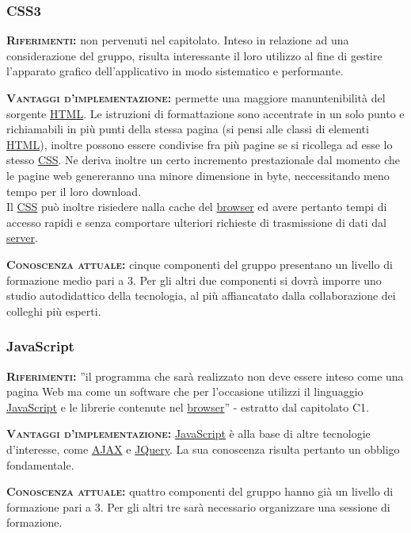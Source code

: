 \subsubsection{CSS3}
\begin{description}
	\item{\scshape\bfseries Riferimenti:} non pervenuti nel capitolato. Inteso in relazione ad una considerazione del gruppo, risulta interessante il loro utilizzo al fine di gestire l'apparato grafico dell'applicativo in modo sistematico e performante.
	
\item{\scshape\bfseries Vantaggi d'implementazione:} permette una maggiore manuntenibilità del sorgente \underline{HTML}. Le istruzioni di formattazione sono accentrate in un solo punto e richiamabili in più punti della stessa pagina (si pensi alle classi di elementi \underline{HTML}), inoltre possono essere condivise fra più pagine se si ricollega ad esse lo stesso \underline{CSS}\@. Ne deriva inoltre un certo incremento prestazionale dal momento che le pagine web genereranno una minore dimensione in byte, neccessitando meno tempo per il loro download. \\Il \underline{CSS} può inoltre risiedere nalla cache del \underline{browser} ed avere pertanto tempi di accesso rapidi e senza comportare ulteriori richieste di trasmissione di dati dal \underline{server}.
	
	\item{\scshape\bfseries Conoscenza attuale:} cinque componenti del gruppo presentano un livello di formazione medio pari a 3. Per gli altri due componenti si dovrà imporre uno studio autodidattico della tecnologia, al più affiancatato dalla collaborazione dei colleghi più esperti.
\end{description}

\subsubsection{JavaScript}
\begin{description} 
	\item{\scshape\bfseries Riferimenti:}
  ''il programma che sarà realizzato non deve essere inteso come una pagina Web ma come un software che per l'occasione utilizzi il linguaggio \underline{JavaScript} e le librerie contenute nel \underline{browser}'' - estratto dal capitolato C1.

	\item{\scshape\bfseries Vantaggi d'implementazione:} \underline{JavaScript} è alla base di altre tecnologie d'interesse, come \underline{AJAX} e \underline{JQuery}. La sua conoscenza risulta pertanto un obbligo fondamentale.

	\item{\scshape\bfseries Conoscenza attuale:} quattro componenti del gruppo hanno già un livello di formazione pari a 3. Per gli altri tre sarà necessario organizzare una sessione di formazione.
\end{description}

